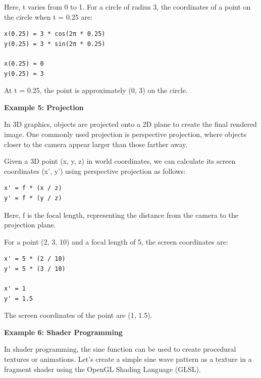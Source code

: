 \documentclass[
]{article}
\begin{document}
Here, t varies from 0 to 1. For a circle of radius 3, the coordinates of
a point on the circle when t = 0.25 are:

\begin{verbatim}
x(0.25) = 3 * cos(2π * 0.25)
y(0.25) = 3 * sin(2π * 0.25)

x(0.25) ≈ 0
y(0.25) ≈ 3
\end{verbatim}

At t = 0.25, the point is approximately (0, 3) on the circle.

\textbf{Example 5: Projection}

In 3D graphics, objects are projected onto a 2D plane to create the
final rendered image. One commonly used projection is perspective
projection, where objects closer to the camera appear larger than those
farther away.

Given a 3D point (x, y, z) in world coordinates, we can calculate its
screen coordinates (x', y') using perspective projection as follows:

\begin{verbatim}
x' = f * (x / z)
y' = f * (y / z)
\end{verbatim}

Here, f is the focal length, representing the distance from the camera
to the projection plane.

For a point (2, 3, 10) and a focal length of 5, the screen coordinates
are:

\begin{verbatim}
x' = 5 * (2 / 10)
y' = 5 * (3 / 10)

x' = 1
y' = 1.5
\end{verbatim}

The screen coordinates of the point are (1, 1.5).

\textbf{Example 6: Shader Programming}

In shader programming, the sine function can be used to create
procedural textures or animations. Let's create a simple sine wave
pattern as a texture in a fragment shader using the OpenGL Shading
Language (GLSL).
\end{document}
